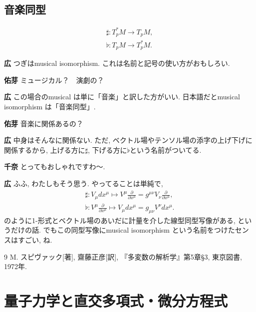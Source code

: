 \documentclass{ltjsarticle}
\theoremstyle{definition}
\newcommand{\parno}{\par\noindent}
\begin{document}
\subsection{音楽同型}
\begin{tcolorbox}
  \begin{align}
    \sharp:T_p^\ast M\to T_pM,\\
    \flat:T_pM\to T_p^\ast M.
  \end{align}
\end{tcolorbox}
\parno
\textbf{広} つぎはmusical isomorphism. これは名前と記号の使い方がおもしろい.\parno
\textbf{佑芽} ミュージカル？　演劇の？\parno
\textbf{広} この場合のmusical は単に「音楽」と訳した方がいい. 日本語だとmusical isomorphism は「音楽同型」.\parno
\textbf{佑芽} 音楽に関係あるの？\parno
\textbf{広} 中身はそんなに関係ない. ただ, ベクトル場やテンソル場の添字の上げ下げに関係するから, 上げる方に$\sharp$, 下げる方に$\flat$という名前がついてる.\parno
\textbf{千奈} とってもおしゃれですわ〜.\parno
\textbf{広} ふふ, わたしもそう思う. やってることは単純で,
\begin{align}
  \sharp:V_\mu dx^\mu\mapsto V^\mu\frac\partial{\partial x^\mu}=g^{\mu\nu}V_{\nu}\frac\partial{\partial x^\mu},\\
  \flat:V^\mu\frac\partial{\partial x^\mu}\mapsto V_\mu dx^\mu=g_{\mu\nu}V^\nu dx^\mu.
\end{align}
のように1-形式とベクトル場のあいだに計量を介した線型同型写像がある, というだけの話. でもこの同型写像にmusical isomorphism という名前をつけたセンスはすごい, ね.

\begin{thebibliography}{9}
  \bibitem{} M. スピヴァック[著], 齋藤正彦[訳], 『多変数の解析学』第5章\S3, 東京図書, 1972年.
\end{thebibliography}

\section{量子力学と直交多項式・微分方程式}
\end{document}
